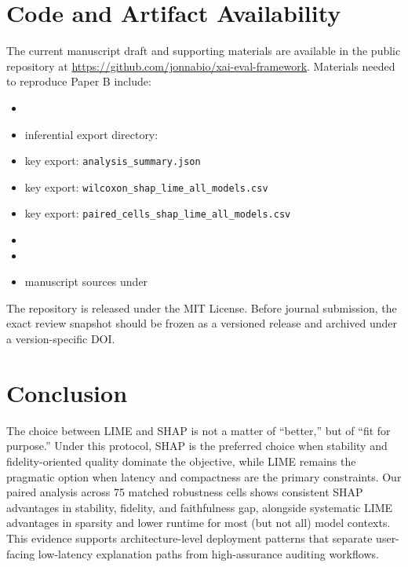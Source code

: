 \documentclass[twoside,11pt]{article}
\begin{document}
\section{Code and Artifact Availability}
The current manuscript draft and supporting materials are available in
the public repository at
\url{https://github.com/jonnabio/xai-eval-framework}. Materials needed
to reproduce Paper B include:
\begin{itemize}[leftmargin=*]
\item {}
\item inferential export directory:
\item key export: \texttt{analysis\_summary.json}
\item key export: \texttt{wilcoxon\_shap\_lime\_all\_models.csv}
\item key export: \texttt{paired\_cells\_shap\_lime\_all\_models.csv}
\item {}
\item {}
\item manuscript sources under 
\end{itemize}
The repository is released under the MIT License. Before journal
submission, the exact review snapshot should be frozen as a versioned
release and archived under a version-specific DOI.

\section{Conclusion}

The choice between LIME and SHAP is not a matter of ``better,'' but of
``fit for purpose.'' Under this protocol, SHAP is the preferred choice
when stability and fidelity-oriented quality dominate the objective,
while LIME remains the pragmatic option when latency and compactness are
the primary constraints. Our paired analysis across 75 matched
robustness cells shows consistent SHAP advantages in stability,
fidelity, and faithfulness gap, alongside systematic LIME advantages in
sparsity and lower runtime for most (but not all) model contexts. This
evidence supports architecture-level deployment patterns that separate
user-facing low-latency explanation paths from high-assurance auditing
workflows.

\end{document}
